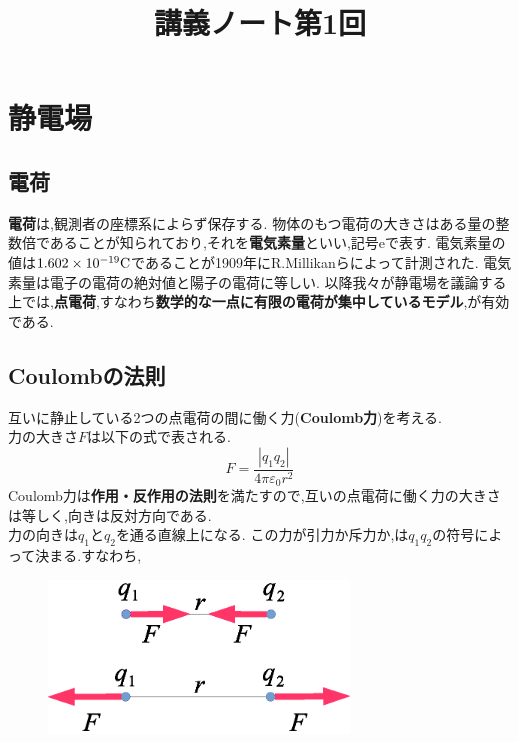 \documentclass{jsarticle}
\title{講義ノート第1回}
\author{}
\date{}
\begin{document}
\maketitle

\section{静電場}

\subsection{電荷}

{\bf 電荷}は,観測者の座標系によらず保存する.
物体のもつ電荷の大きさはある量の整数倍であることが知られており,それを{\bf 電気素量}といい,記号eで表す.
電気素量の値は$1.602 \times 10^{-19}{\rm C}$であることが1909年にR.Millikanらによって計測された.
電気素量は電子の電荷の絶対値と陽子の電荷に等しい.
以降我々が静電場を議論する上では,{\bf 点電荷},すなわち{\bf 数学的な一点に有限の電荷が集中しているモデル},が有効である.

\subsection{Coulombの法則}


互いに静止している2つの点電荷の間に働く力({\bf Coulomb力})を考える.\\
力の大きさ$F$は以下の式で表される.\\
\begin{equation}
F=\frac{|q_{1}q_{2}|}{4\pi \varepsilon_{0} r^2}
\end{equation}
Coulomb力は{\bf 作用・反作用の法則}を満たすので,互いの点電荷に働く力の大きさは等しく,向きは反対方向である.\\
力の向きは$q_{1}$と$q_{2}$を通る直線上になる.
この力が引力か斥力か,は$q_1q_2$の符号によって決まる.すなわち,

\begin{figure}[htbp]
 \begin{center}
  \includegraphics[width=80mm]{1.1.eps}
 \end{center}
 \caption{}
 \label{fig:one}
\end{figure}
\end{document}
